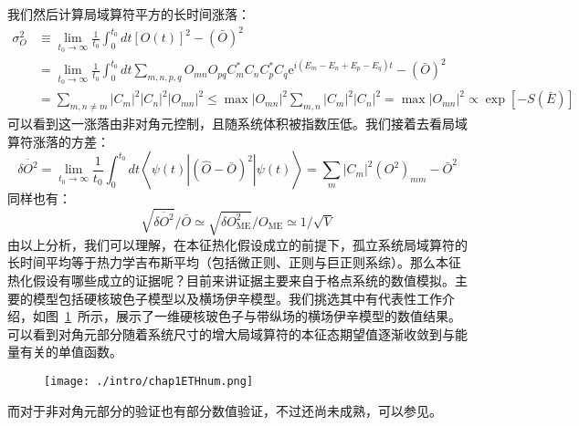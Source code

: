 我们然后计算局域算符平方的长时间涨落：
\begin{equation}
\begin{aligned}
\sigma_{O}^{2} & \equiv \lim _{t_{0} \rightarrow \infty} \frac{1}{t_{0}} \int_{0}^{t_{0}} d t[O(t)]^{2}-(\bar{O})^{2} \\
&=\lim _{t_{0} \rightarrow \infty} \frac{1}{t_{0}} \int_{0}^{t_{0}} d t \sum_{m, n, p, q} O_{m n} O_{p q} C_{m}^{*} C_{n} C_{p}^{*} C_{q} \mathrm{e}^{i\left(E_{m}-E_{n}+E_{p}-E_{q}\right) t}-(\bar{O})^{2} \\
&=\sum_{m, n \neq m}\left|C_{m}\right|^{2}\left|C_{n}\right|^{2}\left|O_{m n}\right|^{2} \leq \max \left|O_{m n}\right|^{2} \sum_{m, n}\left|C_{m}\right|^{2}\left|C_{n}\right|^{2}=\max \left|O_{m n}\right|^{2} \propto \exp [-S(\bar{E})]
\end{aligned}
\end{equation}
可以看到这一涨落由非对角元控制，且随系统体积被指数压低。我们接着去看局域算符涨落的方差：
\begin{equation}
\overline{\delta O^{2}}=\lim _{t_{0} \rightarrow \infty} \frac{1}{t_{0}} \int_{0}^{t_{0}} d t\left\langle\psi(t)\left|(\hat{O}-\bar{O})^{2}\right| \psi(t)\right\rangle=\sum_{m}\left|C_{m}\right|^{2}\left(O^{2}\right)_{m m}-\bar{O}^{2}
\end{equation}
同样也有：
\begin{equation}
\sqrt{\overline{\delta O^{2}}} / \bar{O} \simeq \sqrt{\delta O_{\mathrm{ME}}^{2}} / O_{\mathrm{ME}} \simeq 1 / \sqrt{V}
\end{equation}
由以上分析，我们可以理解，在本征热化假设成立的前提下，孤立系统局域算符的长时间平均等于热力学吉布斯平均（包括微正则、正则与巨正则系综）。那么本征热化假设有哪些成立的证据呢？目前来讲证据主要来自于格点系统的数值模拟。主要的模型包括硬核玻色子模型\cite{rigol2008thermalization,Santos2010Localization,Rigol2009Breakdown,Rigol2010Quantum,Neuenhahn2012Thermalization,Steinigeweg2013Eigenstate,Kim2014testing,beugeling2014finite,Steinigeweg2014Pushing,Khodja2015Relevance,Beugeling2015Off-diagonal}以及横场伊辛模型\cite{Fratus2015Eigenstate,Mondaini2016Eigenstate,Mondaini2017Eigenstate,blass2016test,Serbyn2013local}。我们挑选其中有代表性工作介绍，如图~\ref{ETHnum}~所示，展示了一维硬核玻色子与带纵场的横场伊辛模型的数值结果\cite{Kim2014testing}。可以看到对角元部分随着系统尺寸的增大局域算符的本征态期望值逐渐收敛到与能量有关的单值函数。
\begin{figure}[!htbp]
    \centering
    \texttt{[image: ./intro/chap1ETHnum.png]}
    \label{ETHnum}
\end{figure}
而对于非对角元部分的验证也有部分数值验证，不过还尚未成熟，可以参见\cite{Beugeling2015Off-diagonal,Mondaini2017Eigenstate}。

